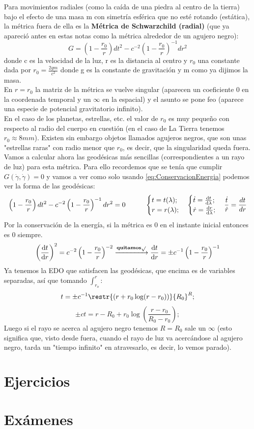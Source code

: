 \documentclass[palatino, bibnumbers]{apuntes}
\begin{document}
\begin{example}Para movimientos radiales (como la caída de una piedra al centro de la tierra) bajo el efecto de una masa m con simetría esférica que no esté rotando (estática), la métrica fuera de ella es la \textbf{Métrica de Schwarzchild (radial)} (que ya apareció antes en estas notas como la métrica alrededor de un agujero negro):
	$$G=\left(1-\frac{r_0}{r}\right)dt^2-c^{-2}\left(1-\frac{r_0}{r}\right)^{-1}dr^2$$
donde c es la velocidad de la luz, r es la distancia al centro y $r_0$ una constante dada por $r_0=\frac{2gm}{c^2}$ donde g es la constante de gravitación y m como ya dijimos la masa.\\ \indent En $r=r_0$ la matriz de la métrica se vuelve singular (aparecen un coeficiente 0 en la coordenada temporal y un $\infty$ en la espacial) y el asunto se pone feo (aparece una especie de potencial gravitatorio infinito).\\ \indent En el caso de los planetas, estrellas, etc. el valor de $r_0$ es muy pequeño con respecto al radio del cuerpo en cuestión (en el caso de La Tierra tenemos $r_0\approx8mm$). Existen sin embargo objetos llamados agujeros negros, que son unas "estrellas raras" con radio menor que $r_0$, es decir, que la singularidad queda fuera.\\ \indent Vamos a calcular ahora las geodésicas más sencillas (correspondientes a un rayo de luz) para esta métrica. Para ello recordemos que se tenía que cumplir $G(\dot{\gamma},\dot{\gamma})=0$ y vamos a ver como solo usando \ref{eq:ConservacionEnergia} podemos ver la forma de las geodésicas:
$$\left(1-\frac{r_0}{r}\right)dt^2-c^{-2}\left(1-\frac{r_0}{r}\right)^{-1}dr^2=0\hspace*{1cm}\begin{cases}t=t(\lambda);\\r=r(\lambda);\end{cases}\begin{cases}\dot{t}=\dv{t}{\lambda};\\\dot{r}=\dv{r}{\lambda};\end{cases}\frac{\dot{t}}{\dot{r}}=\frac{dt}{dr}$$ 
\indent Por la conservación de la energía, si la métrica es 0 en el instante inicial entonces es 0 siempre.
$$\left(\dv{t}{r}\right)^2=c^{-2}\left(1-\frac{r_0}{r}\right)^{-2}\xrightarrow{\textbf{quitamos} \sqrt{}}\dv{t}{r}=\pm c^{-1}\left(1-\frac{r_0}{r}\right)^{-1}$$
Ya tenemos la EDO que satisfacen las geodésicas, que encima es de variables separadas, así que tomando $\int_{r_o}^{r}$:
$$t=\pm c^{-1}\restr{(r+r_0\log(r-r_0))}{R_0}^R;$$
$$\pm ct=r-R_0+r_0\log(\frac{r-r_0}{R_0-r_0});$$
Luego si el rayo se acerca al agujero negro tenemos $R=R_0$ sale un $\infty$ (esto significa que, visto desde fuera, cuando el rayo de luz va acercándose al agujero negro, tarda un "tiempo infinito" en atravesarlo, es decir, lo vemos parado).
\end{example}


\appendix

\chapter{Ejercicios}

\chapter{Exámenes}


\printindex
\end{document}
